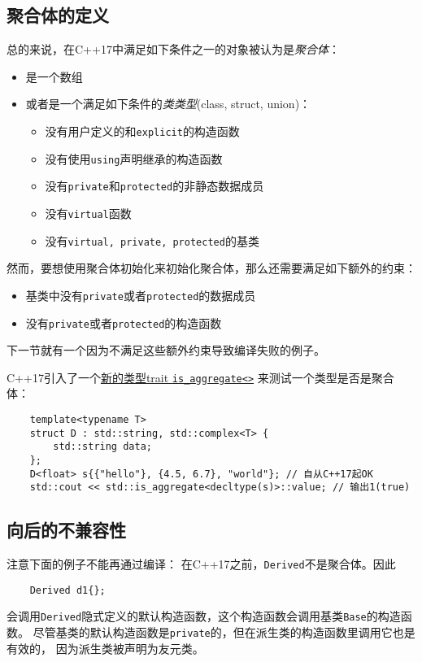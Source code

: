 \subsection{聚合体的定义}
总的来说，在C++17中满足如下条件之一的对象被认为是\emph{聚合体}：
\begin{itemize}[leftmargin=*]
    \item 是一个数组
    \item 或者是一个满足如下条件的\emph{类类型}(class, struct, union)：
    \begin{itemize}[leftmargin=*]
        \item 没有用户定义的和\texttt{explicit}的构造函数
        \item 没有使用\texttt{using}声明继承的构造函数
        \item 没有\texttt{private}和\texttt{protected}的非静态数据成员
        \item 没有\texttt{virtual}函数
        \item 没有\texttt{virtual, private, protected}的基类
    \end{itemize}
\end{itemize}
然而，要想使用聚合体初始化来初始化聚合体，那么还需要满足如下额外的约束：
\begin{itemize}[leftmargin=*]
    \item 基类中没有\texttt{private}或者\texttt{protected}的数据成员
    \item 没有\texttt{private}或者\texttt{protected}的构造函数
\end{itemize}
下一节就有一个因为不满足这些额外约束导致编译失败的例子。

C++17引入了一个\hyperref[ch21.2.1]{新的类型trait \texttt{is\_aggregate<>}}
来测试一个类型是否是聚合体：
\begin{lstlisting}
    template<typename T>
    struct D : std::string, std::complex<T> {
        std::string data;
    };
    D<float> s{{"hello"}, {4.5, 6.7}, "world"}; // 自从C++17起OK
    std::cout << std::is_aggregate<decltype(s)>::value; // 输出1(true)
\end{lstlisting}

\subsection{向后的不兼容性}
注意下面的例子不能再通过编译：
在C++17之前，\texttt{Derived}不是聚合体。因此
\begin{lstlisting}
    Derived d1{};
\end{lstlisting}
会调用\texttt{Derived}隐式定义的默认构造函数，这个构造函数会调用基类\texttt{Base}的构造函数。
尽管基类的默认构造函数是\texttt{private}的，但在派生类的构造函数里调用它也是有效的，
因为派生类被声明为友元类。

